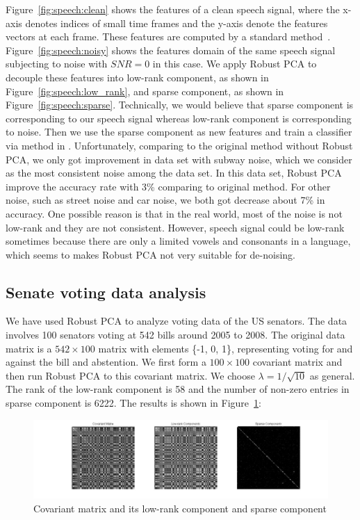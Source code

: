 Figure~\ref{fig:speech:clean} shows the features of a clean speech signal, where the x-axis denotes indices of small time frames and the y-axis denote the features vectors at each frame. These features are computed by a standard method~\cite{Kim:2009}. Figure~\ref{fig:speech:noisy} shows the features domain of the same speech signal subjecting to noise with $SNR = 0$ in this case. We apply Robust PCA to decouple these features into low-rank component, as shown in Figure~\ref{fig:speech:low_rank}, and sparse component, as shown in Figure~\ref{fig:speech:sparse}. Technically, we would believe that sparse component is corresponding to our speech signal whereas low-rank component is corresponding to noise. Then we use the sparse component as new features and train a classifier via method in \cite{Young:2006fj}. Unfortunately, comparing to the original method without  Robust PCA, we only got improvement in data set with subway noise, which we consider as the most consistent noise among the data set. In this data set, Robust PCA improve the accuracy rate with 3\% comparing to original method. For other noise, such as street noise and car noise, we both got decrease about 7\% in accuracy. One possible reason is that in the real world, most of the noise is not low-rank and they are not consistent. However, speech signal could be low-rank sometimes because there are only a limited vowels and consonants in a language, which seems to makes Robust PCA not very suitable for de-noising.  

\subsection{Senate voting data analysis}
We have used Robust PCA to analyze voting data of the US senators. The data involves 100 senators voting at 542 bills around 2005 to 2008. The original data matrix is a $542\times100$ matrix with elements \{-1, 0, 1\}, representing voting for and against the bill and abstention. We first form a $100\times100$ covariant matrix and then run Robust PCA to this covariant matrix. We choose $\lambda = 1/\sqrt{10}$ as general. The rank of the low-rank component is 58 and the number of non-zero entries in sparse component is 6222. The results is shown in Figure~\ref{fig:vote:covariant}:


\begin{figure}[h]
  \centering
  \includegraphics[width=1\textwidth]{../figures/vote_cov.pdf}
  \caption{Covariant matrix and its low-rank component and sparse component}
  \label{fig:vote:covariant}
\end{figure}

